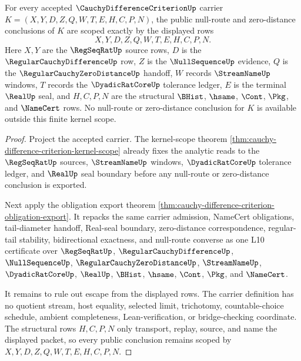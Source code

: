 \begin{theorem}
\label{thm:cauchy-difference-criterion-scope-package}
For every accepted $\CauchyDifferenceCriterionUp$ carrier $K=(X,Y,D,Z,Q,W,T,E,H,C,P,N)$, the public null-route and zero-distance conclusions of $K$ are scoped exactly by the displayed rows
$$
X,Y,D,Z,Q,W,T,E,H,C,P,N .
$$
Here $X,Y$ are the $\RegSeqRatUp$ source rows, $D$ is the $\RegularCauchyDifferenceUp$ row, $Z$ is the $\NullSequenceUp$ evidence, $Q$ is the $\RegularCauchyZeroDistanceUp$ handoff, $W$ records $\StreamNameUp$ windows, $T$ records the $\DyadicRatCoreUp$ tolerance ledger, $E$ is the terminal $\RealUp$ seal, and $H,C,P,N$ are the structural $\BHist$, $\hsame$, $\Cont$, $\Pkg$, and $\NameCert$ rows. No null-route or zero-distance conclusion for $K$ is available outside this finite kernel scope.
\end{theorem}
\begin{proof}
Project the accepted carrier. The kernel-scope theorem \autoref{thm:cauchy-difference-criterion-kernel-scope} already fixes the analytic reads to the $\RegSeqRatUp$ sources, $\StreamNameUp$ windows, $\DyadicRatCoreUp$ tolerance ledger, and $\RealUp$ seal boundary before any null-route or zero-distance conclusion is exported.

Next apply the obligation export theorem \autoref{thm:cauchy-difference-criterion-obligation-export}. It repacks the same carrier admission, NameCert obligations, tail-diameter handoff, Real-seal boundary, zero-distance correspondence, regular-tail stability, bidirectional exactness, and null-route converse as one L10 certificate over $\RegSeqRatUp$, $\RegularCauchyDifferenceUp$, $\NullSequenceUp$, $\RegularCauchyZeroDistanceUp$, $\StreamNameUp$, $\DyadicRatCoreUp$, $\RealUp$, $\BHist$, $\hsame$, $\Cont$, $\Pkg$, and $\NameCert$.

It remains to rule out escape from the displayed rows. The carrier definition has no quotient stream, host equality, selected limit, trichotomy, countable-choice schedule, ambient completeness, Lean-verification, or bridge-checking coordinate. The structural rows $H,C,P,N$ only transport, replay, source, and name the displayed packet, so every public conclusion remains scoped by $X,Y,D,Z,Q,W,T,E,H,C,P,N$.
\end{proof}

